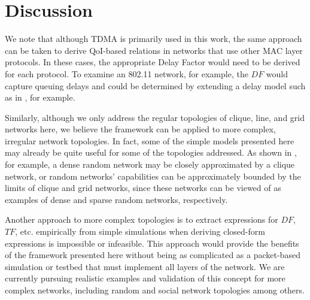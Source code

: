 \section{Discussion}
\label{sec:discussion}


We note that although TDMA is primarily used in this work, the same approach can be taken to derive QoI-based relations in networks that use other MAC layer protocols.  In these cases, the appropriate Delay Factor would need to be derived for each protocol.  To examine an 802.11 network, for example, the $DF$ would capture queuing delays and could be determined by extending a delay model such as in \cite{perf_anal_80211_lan_mac}, for example.  

Similarly, although we only address the regular topologies of clique, line, and grid networks here, we believe the framework can be applied to more complex, irregular network topologies.  In fact, some of the simple models presented here may already be quite useful for some of the topologies addressed.  As shown in \cite{symptotics_tech_report}, for example, a dense random network may be closely approximated by a clique network, or random networks' capabilities can be approximately bounded by the limits of clique and grid networks, since these networks can be viewed of as examples of dense and sparse random networks, respectively.  

Another approach to more complex topologies is to extract expressions for $DF$, $TF$, etc. empirically from simple simulations when deriving closed-form expressions is impossible or infeasible.  This approach would provide the benefits of the framework presented here without being as complicated as a packet-based simulation or testbed that must implement all layers of the network.  We are currently pursuing realistic examples and validation of this concept for more complex networks, including random and social network topologies among others. 

